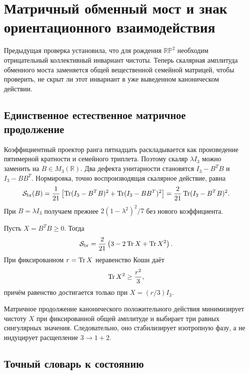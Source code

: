 \chapter{Матричный обменный мост и знак ориентационного взаимодействия}

Предыдущая проверка установила, что для рождения $\mathbb{RP}^2$ необходим
отрицательный коллективный инвариант чистоты. Теперь скалярная амплитуда
обменного моста заменяется общей вещественной семейной матрицей, чтобы
проверить, не скрыт ли этот инвариант в уже выведенном каноническом
действии.

\section{Единственное естественное матричное продолжение}

Коэффициентный проектор ранга пятнадцать раскладывается как произведение
пятимерной кратности и семейного триплета. Поэтому скаляр
$\lambda I_3$ можно заменить на $B\in M_3(\mathbb R)$. Два дефекта
унитарности становятся $I_3-B^TB$ и $I_3-BB^T$. Нормировка, точно
воспроизводящая скалярное действие, равна
\begin{equation}
 \mathcal S_{\rm br}(B)
 =\frac1{21}\left[
  \operatorname{Tr}(I_3-B^TB)^2+\operatorname{Tr}(I_3-BB^T)^2\right]
 =\frac2{21}\operatorname{Tr}(I_3-B^TB)^2.
 \label{eq:v6-matrix-bridge-action}
\end{equation}
При $B=\lambda I_3$ получаем прежнее
$2(1-\lambda^2)^2/7$ без нового коэффициента.

Пусть $X=B^TB\ge0$. Тогда
\begin{equation}
 \mathcal S_{\rm br}
 =\frac2{21}\left(3-2\operatorname{Tr} X+\operatorname{Tr} X^2\right).
 \label{eq:v6-bridge-purity-sign}
\end{equation}
При фиксированном $r=\operatorname{Tr} X$ неравенство Коши даёт
\begin{equation}
 \operatorname{Tr} X^2\ge\frac{r^2}{3},
\end{equation}
причём равенство достигается только при $X=(r/3)I_3$.

\begin{theorem}
Матричное продолжение канонического положительного действия минимизирует
чистоту $X$ при фиксированной общей амплитуде и выбирает три равных
сингулярных значения. Следовательно, оно стабилизирует изотропную фазу,
а не индуцирует расщепление $3\to1+2$.
\end{theorem}

\section{Точный словарь к состоянию}

